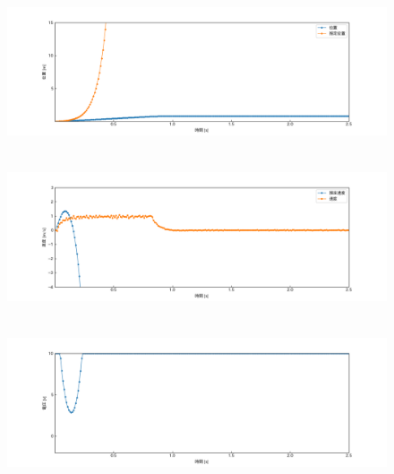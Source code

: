 \documentclass[12pt]{jsarticle}
\begin{document}
\begin{figure}[H]
  \begin{center}
    \includegraphics[clip,width=13.0cm, height=4.4cm]{../img/Exp6-1.png}
    \caption{}
    \label{Exp6-1}
  \end{center}
\end{figure}
\begin{figure}[H]
  \begin{center}
    \includegraphics[clip,width=13.0cm, height=4.4cm]{../img/Exp6-2.png}
    \caption{}
    \label{Exp6-2}
  \end{center}
\end{figure}
\begin{figure}[H]
  \begin{center}
    \includegraphics[clip,width=13.0cm, height=4.4cm]{../img/Exp6-3.png}
    \caption{}
    \label{Exp6-3}
  \end{center}
\end{figure}
\end{document}
